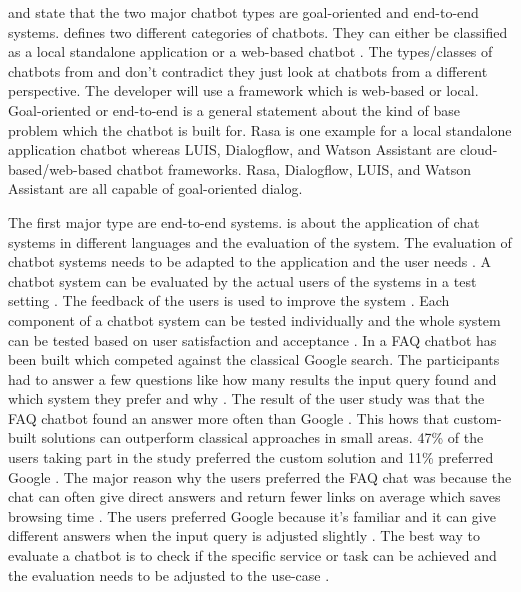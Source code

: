 \citet{williams2017hybrid} and \citet{bordes2016learning} state that the two major chatbot types are goal-oriented and end-to-end systems.
\citet{kane2016role} defines two different categories of chatbots.
They can either be classified as a local standalone application or a web-based chatbot \cite{kane2016role}.
The types/classes of chatbots from \citet{williams2017hybrid, bordes2016learning} and \citet{kane2016role} 
don't contradict they just look at chatbots from a different perspective.
The developer will use a framework which is web-based or local.
Goal-oriented or end-to-end is a general statement about the kind of base problem 
which the chatbot is built for.
Rasa is one example for a local standalone application chatbot whereas LUIS, 
Dialogflow, and Watson Assistant are cloud-based/web-based chatbot frameworks.
Rasa, Dialogflow, LUIS, and Watson Assistant are all capable of goal-oriented dialog.

The first major type are end-to-end systems.
\citet{evaluateChatbotsShawar2007} is about the application of chat systems in different languages and the evaluation of the system.
The evaluation of chatbot systems needs to be adapted to the application and the user needs \cite{evaluateChatbotsShawar2007}.
A chatbot system can be evaluated by the actual users of the systems in a test setting \cite{evaluateChatbotsShawar2007}.
The feedback of the users is used to improve the system \cite{evaluateChatbotsShawar2007}. 
Each component of a chatbot system can be tested individually and the whole system can be tested based on user 
satisfaction and acceptance \cite{evaluateChatbotsShawar2007}.
In \citet{evaluateChatbotsShawar2007} a FAQ chatbot has been built which competed against the classical Google search.
The participants had to answer a few questions like how many results the input query found and which system they prefer 
and why \cite{evaluateChatbotsShawar2007}. 
The result of the user study was that the FAQ chatbot found an answer more often than Google \cite{evaluateChatbotsShawar2007}.
This hows that custom-built solutions can outperform classical approaches in small areas.
47\% of the users taking part in the study preferred the custom solution and 11\% preferred Google \cite{evaluateChatbotsShawar2007}.
The major reason why the users preferred the FAQ chat was because the chat can often give direct answers and return 
fewer links on average which saves browsing time \cite{evaluateChatbotsShawar2007}. 
The users preferred Google because it's familiar and it can give different answers when the input query is adjusted 
slightly \cite{evaluateChatbotsShawar2007}.
The best way to evaluate a chatbot is to check if the specific service or task can be achieved and the evaluation 
needs to be adjusted to the use-case \cite{evaluateChatbotsShawar2007}.

